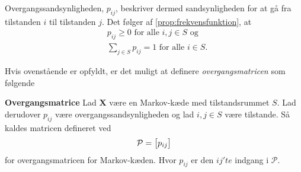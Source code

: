 Overgangssandsynligheden, $p_{ij}$, beskriver dermed sandsynligheden for at gå fra tilstanden $i$ til tilstanden $j$. Det følger af \autoref{prop:frekvensfunktion}, at
%
\begin{align*}
    &p_{ij}\geq 0 \text{ for alle } i,j\in S \text{ og}\\
    &\sum_{j\in S} p_{ij}=1 \text{ for alle } i\in S.
\end{align*}

%

Hvis ovenstående er opfyldt, er det muligt at definere \textit{overgangsmatricen} som følgende

\begin{minipage}\textwidth
\begin{defn}\textbf{Overgangsmatrice}\label{def:ovegangsmatrice} %
\newline
Lad $\bm X$ være en Markov-kæde med tilstandsrummet $S$. Lad derudover $p_{ij}$ være overgangssandsynligheden og lad $i,j \in S$ være tilstande. Så kaldes matricen defineret ved
\begin{align*}
    \P = \left[p_{ij}\right]
\end{align*}
for overgangsmatricen for Markov-kæden. Hvor $p_{ij}$ er den $ij'te$ indgang i $\mathcal{P}$.
\end{defn}
\end{minipage}





